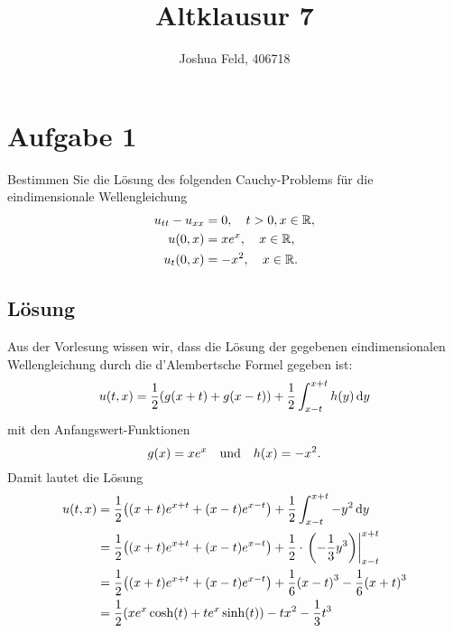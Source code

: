 \documentclass{exercise}
\institute{Applied and Computational Mathematics}
\title{Altklausur 7}
\author{Joshua Feld, 406718}
\begin{document}
    \maketitle


    \section*{Aufgabe 1}
    
    \begin{problem}
        Bestimmen Sie die Lösung des folgenden Cauchy-Problems für die eindimensionale Wellengleichung
        \begin{align*}
            u_{tt} - u_{xx} &= 0, \quad t > 0, x \in \R,\\
            u\parentheses*{0, x} &= xe^x, \quad x \in \R,\\
            u_t\parentheses*{0, x} &= -x^2, \quad x \in \R.
        \end{align*}
    \end{problem}
    
    \subsection*{Lösung}
    Aus der Vorlesung wissen wir, dass die Lösung der gegebenen eindimensionalen Wellengleichung durch die d'Alembertsche Formel gegeben ist:
    \[
        u\parentheses*{t, x} = \frac{1}{2}\parentheses*{g\parentheses*{x + t} + g\parentheses*{x - t}} + \frac{1}{2}\int_{x - t}^{x + t}h\parentheses*{y}\d y
    \]
    mit den Anfangswert-Funktionen
    \[
        g\parentheses*{x} = xe^x \quad \text{und} \quad h\parentheses*{x} = -x^2.
    \]
    Damit lautet die Lösung
    \begin{align*}
        u\parentheses*{t, x} &= \frac{1}{2}\parentheses*{\parentheses*{x + t}e^{x + t} + \parentheses*{x - t}e^{x - t}} + \frac{1}{2}\int_{x - t}^{x + t}-y^2 \d y\\
        &= \frac{1}{2}\parentheses*{\parentheses*{x + t}e^{x + t} + \parentheses*{x - t}e^{x - t}} + \frac{1}{2} \cdot \left.\parentheses*{-\frac{1}{3}y^3}\right|_{x - t}^{x + t}\\
        &= \frac{1}{2}\parentheses*{\parentheses*{x + t}e^{x + t} + \parentheses*{x - t}e^{x - t}} + \frac{1}{6}\parentheses*{x - t}^3 - \frac{1}{6}\parentheses*{x + t}^3\\
        &= \frac{1}{2}\parentheses*{xe^x \cosh\parentheses*{t} + te^x \sinh\parentheses*{t}} - tx^2 - \frac{1}{3}t^3
    \end{align*}
\end{document}
